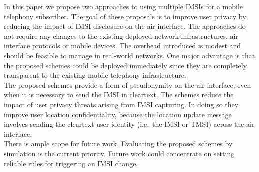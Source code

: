 \documentclass{acm_proc_article-sp}
\begin{document}
In this paper we propose two approaches to using multiple IMSIs for a mobile telephony subscriber. The goal of these proposals is to improve user privacy by reducing the impact of IMSI disclosure on the air interface. The approaches do not require any changes to the existing deployed network infrastructures, air interface protocols or mobile devices. The overhead introduced is modest and should be feasible to manage in real-world networks. One major advantage is that the proposed schemes could be deployed immediately since they are completely transparent to the existing mobile telephony infrastructure. \\

The proposed schemes provide a form of pseudonymity on the air interface, even when it is necessary to send the IMSI in cleartext. The schemes reduce the impact of user privacy threats arising from IMSI capturing. In doing so they improve user location confidentiality, because the location update message involves sending the cleartext user identity (i.e.\ the IMSI or TMSI) across the air interface.\\

There is ample scope for future work. Evaluating the proposed schemes by simulation is the current priority. Future work could concentrate on setting reliable rules for triggering an IMSI change.




\balance

\end{document}
